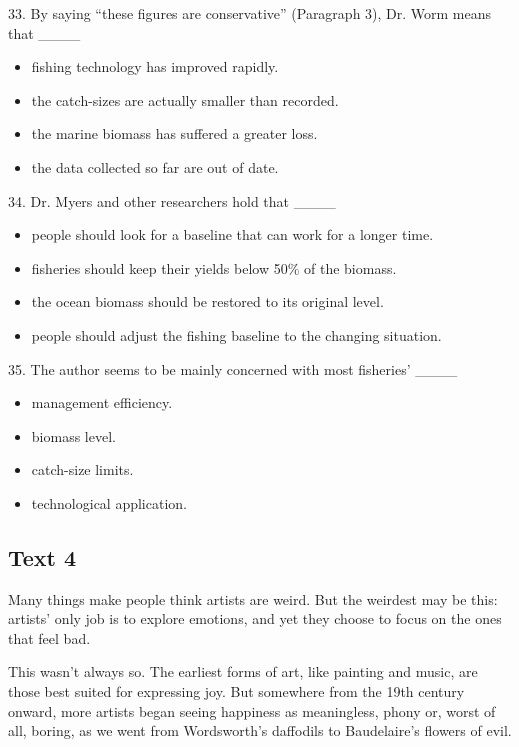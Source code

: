 \documentclass[UTF8,11pt]{ctexart}
\begin{document}
33. By saying “these figures are conservative” (Paragraph 3), Dr. Worm means that \_\_\_\_


\begin{itemize}[leftmargin=2em,itemsep=.2em,topsep=.4em]\item[A.] fishing technology has improved rapidly.
\item[B.] the catch-sizes are actually smaller than recorded.
\item[C.] the marine biomass has suffered a greater loss.
\item[D.] the data collected so far are out of date.
\end{itemize}

34. Dr. Myers and other researchers hold that \_\_\_\_


\begin{itemize}[leftmargin=2em,itemsep=.2em,topsep=.4em]\item[A.] people should look for a baseline that can work for a longer time.
\item[B.] fisheries should keep their yields below 50\% of the biomass.
\item[C.] the ocean biomass should be restored to its original level.
\item[D.] people should adjust the fishing baseline to the changing situation.
\end{itemize}

35. The author seems to be mainly concerned with most fisheries’ \_\_\_\_


\begin{itemize}[leftmargin=2em,itemsep=.2em,topsep=.4em]\item[A.] management efficiency.
\item[B.] biomass level.
\item[C.] catch-size limits.
\item[D.] technological application.
\end{itemize}

\subsection*{\textbf{Text 4}}


Many things make people think artists are weird. But the weirdest may be this: artists’ only job is to explore emotions, and yet they choose to focus on the ones that feel bad.


This wasn’t always so. The earliest forms of art, like painting and music, are those best suited for expressing joy. But somewhere from the 19th century onward, more artists began seeing happiness as meaningless, phony or, worst of all, boring, as we went from Wordsworth’s daffodils to Baudelaire’s flowers of evil.
\end{document}
